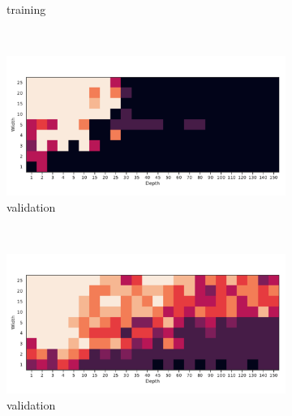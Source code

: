 \begin{figure}
\begin{subfigure}[b]{0.3\textwidth}
        \caption{\SepUnitPoint training}
        \label{fig:moons_grid_up}
    \end{subfigure}
    ~ %
    \\
    \begin{subfigure}[b]{0.3\textwidth}
        \includegraphics[width=\textwidth]{img/moons_grid/val-acc-relu.pdf}
        \caption{\ReLU validation}
        \label{fig:moons_grid_relu}
    \end{subfigure}
    ~ %
    \centering
    \begin{subfigure}[b]{0.3\textwidth}
        \includegraphics[width=\textwidth]{img/moons_grid/val-acc-relu-bn.pdf}
        \caption{\ReLUBN validation}
        \label{fig:moons_grid_relubn}
    \end{subfigure}
    ~ %
    \centering
    \begin{subfigure}[b]{0.3\textwidth}

\end{subfigure}
\end{figure}
